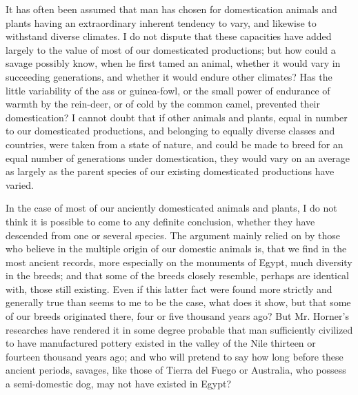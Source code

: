 \documentclass{book}
\begin{document}
It has often been assumed that man has chosen for domestication animals and
plants having an extraordinary inherent tendency to vary, and likewise to
withstand diverse climates. I do not dispute that these capacities have added
largely to the value of most of our domesticated productions; but how could a
savage possibly know, when he first tamed an animal, whether it would vary in
succeeding generations, and whether it would endure other climates? Has the
little variability of the ass or guinea-fowl, or the small power of endurance
of warmth by the rein-deer, or of cold by the common camel, prevented their
domestication? I cannot doubt that if other animals and plants, equal in number
to our domesticated productions, and belonging to equally diverse classes and
countries, were taken from a state of nature, and could be made to breed for an
equal number of generations under domestication, they would vary on an average
as largely as the parent species of our existing domesticated productions have
varied.

In the case of most of our anciently domesticated animals and plants, I do not
think it is possible to come to any definite conclusion, whether they have
descended from one or several species. The argument mainly relied on by those
who believe in the multiple origin
of our domestic animals is, that we find in the most ancient records, more
especially on the monuments of Egypt, much diversity in the breeds; and that
some of the breeds closely resemble, perhaps are identical with, those still
existing. Even if this latter fact were found more strictly and generally true
than seems to me to be the case, what does it show, but that some of our breeds
originated there, four or five thousand years ago? But Mr. Horner's
researches have rendered it in some degree probable that man sufficiently
civilized to have manufactured pottery existed in the valley of the Nile
thirteen or fourteen thousand years ago; and who will pretend to say how long
before these ancient periods, savages, like those of Tierra del Fuego or
Australia, who possess a semi-domestic dog, may not have existed in Egypt?
\end{document}

